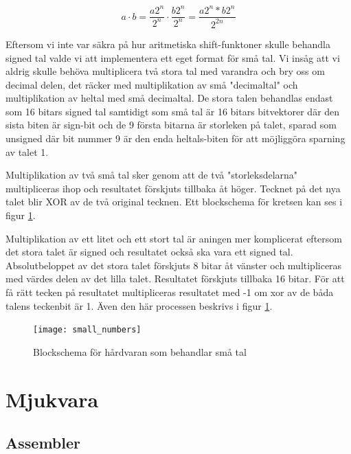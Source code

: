 \documentclass[a4paper]{article}
\begin{document}
    \begin{equation}
        \label{eq:mult_shift}
        a \cdot b = \frac{a 2^n}{2^n} \cdot \frac{b 2^n}{2^n} = \frac{a2^n *
        b2^n}{2^{2n}}
    \end{equation}

    Eftersom vi inte var säkra på hur aritmetiska shift-funktoner skulle
    behandla signed tal valde vi att implementera ett eget format för små tal.
    Vi insåg att vi aldrig skulle behöva multiplicera två stora tal med varandra
    och bry oss om decimal delen, det räcker med multiplikation av små
    "decimaltal" och multiplikation av heltal med små decimaltal. De stora talen
    behandlas endast som 16 bitars signed tal samtidigt som små tal är 16 bitars
    bitvektorer där den sista biten är sign-bit och de 9 första bitarna är
    storleken på talet, sparad som unsigned där bit nummer 9 är den enda heltals-biten
    för att möjliggöra sparning av talet 1. 

    Multiplikation av två små tal sker genom att de två "storleksdelarna"
    multipliceras ihop och resultatet förskjuts tillbaka åt höger. Tecknet på
    det nya talet blir XOR av de två original tecknen. Ett blockschema för
    kretsen kan ses i figur \ref{fig:small_numbers}.

    Multiplikation av ett litet och ett stort tal är aningen mer komplicerat
    eftersom det stora talet är signed och resultatet också ska vara ett
    signed tal. Absolutbeloppet av det stora talet förskjuts 8 bitar åt vänster
    och multipliceras med värdes delen av det lilla talet. Resultatet förskjuts
    tillbaka 16 bitar. För att få rätt tecken på resultatet multipliceras
    resultatet med -1 om xor av de båda talens teckenbit är 1. Även den här
    processen beskrivs i figur \ref{fig:small_numbers}.

    \begin{figure}[H]
        \centering
        \texttt{[image: small\_numbers]}
        \caption{Blockschema för hårdvaran som behandlar små tal}
        \label{fig:small_numbers}
    \end{figure}


    \section{Mjukvara}
    \subsection{Assembler}
\end{document}
